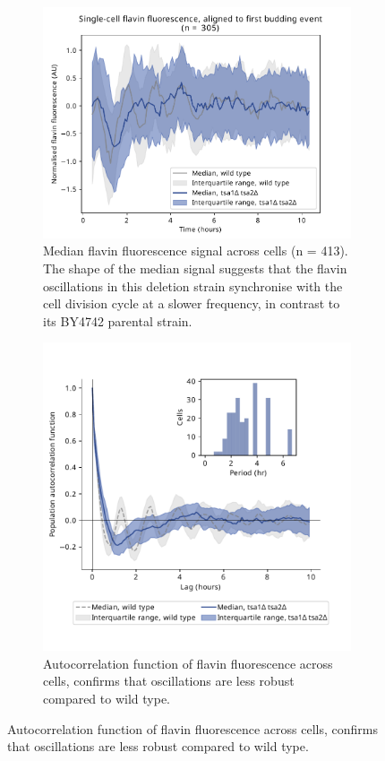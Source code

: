 \begin{figure}
  \centering
  \begin{subfigure}[t]{0.4\textwidth}
   \centering
   \includegraphics[width=\textwidth]{tsa1tsa2morgan_1649_6.pdf}
   \caption{
     Median flavin fluorescence signal across cells (n = 413).%
     The shape of the median signal suggests that the flavin oscillations in this deletion strain synchronise with the cell division cycle at a slower frequency, in contrast to its BY4742 parental strain.
   }
   \label{fig:biology-tsa1tsa2-median}
  \end{subfigure}%
  \begin{subfigure}[t]{0.4\textwidth}
   \centering
   \includegraphics[width=\textwidth]{tsa1tsa2morgan_1649_12.pdf}
   \caption{
    Autocorrelation function of flavin fluorescence across cells, confirms that oscillations are less robust compared to wild type.
   }
   \label{fig:biology-tsa1tsa2-median}
  \end{subfigure}


\end{figure}
